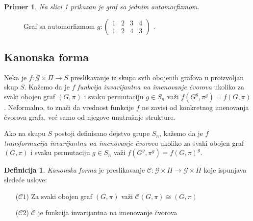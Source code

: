 \documentclass[12pt,oneside]{memoir}
\newtheorem{example}{Primer}
\theoremstyle{definition}
\newtheorem*{definition}{Definicija}
\begin{document}
   \begin{example}
	   Na slici \ref{img:aut} prikazan je graf sa jednim automorfizmom.
   \end{example}

   \begin{figure}[htp]
	   \centering
	   \caption{Graf sa automorfizmom 
	   $g :
	   \begin{pmatrix}
		   1 & 2 & 3 & 4\\
		   1 & 2 & 4 & 3
	   \end{pmatrix}$
       .}
	   \label{img:aut}
   \end{figure}


   \subsection{Kanonska forma}

   Neka je $f : \mathcal{G} \times \Pi \to S$ preslikavanje iz skupa svih
   obojenih grafova u proizvoljan skup $S$.  Kažemo da je $f$ \emph{funkcija
   invarijantna na imenovanje čvorova} ukoliko za svaki obojen graf $(G, \pi)$
   i svaku permutaciju $g \in S_n$ važi $f(G^g, \pi^g) = f(G, \pi)$.
   Neformalno, to znači da vrednost funkcije $f$ ne zavisi od konkretnog
   imenovanja čvorova grafa, već samo od njegove unutrašnje strukture.

   Ako na skupu $S$ postoji definisano dejstvo grupe $S_n$, kažemo da je $f$
   \emph{transformacija invarijantna na imenovanje čvorova} ukoliko za svaki
   obojen graf $(G, \pi)$ i svaku permutaciju $g \in S_n$ važi $f(G^g, \pi^g) =
   f(G, \pi)^g$.


   \begin{definition}
	   \emph{Kanonska forma} je preslikavanje $\mathcal{C} : \mathcal{G} \times \Pi \to
	   \mathcal{G} \times \Pi$ koje ispunjava sledeće uslove:
	   \begin{itemize}
		   \item[($\mathcal{C}1$)] Za svaki obojen graf $(G, \pi)$ važi
			   $\mathcal{C}(G, \pi) \cong (G,
			\pi)$
		\item[($\mathcal{C}2$)] $\mathcal{C}$ je funkcija invarijantna na
			imenovanje čvorova
	   \end{itemize}
   \end{definition}
\end{document}
